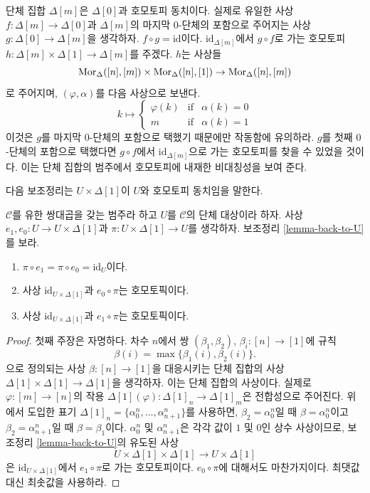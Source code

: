 \begin{example}
\label{example-simplex-contractible}
단체 집합 $\Delta[m]$은 $\Delta[0]$과 호모토피 동치이다. 실제로 유일한
사상 $f : \Delta[m] \to \Delta[0]$과 $\Delta[m]$의 마지막 $0$-단체의
포함으로 주어지는 사상 $g : \Delta[0] \to \Delta[m]$을 생각하자.
$f \circ g = \text{id}$이다. $\text{id}_{\Delta[m]}$에서 $g \circ f$로
가는 호모토피 $h : \Delta[m] \times \Delta[1] \to \Delta[m]$를 주겠다.
$h$는 사상들
$$
\mathop{\mathrm{Mor}}\nolimits_\Delta([n], [m]) \times \mathop{\mathrm{Mor}}\nolimits_\Delta([n], [1]) \to \mathop{\mathrm{Mor}}\nolimits_\Delta([n], [m])
$$
로 주어지며, $(\varphi, \alpha)$를 다음 사상으로 보낸다.
$$
k \mapsto
\left\{
\begin{matrix}
\varphi(k) & \text{if} & \alpha(k) = 0 \\
m & \text{if} & \alpha(k) = 1
\end{matrix}
\right.
$$
이것은 $g$를 마지막 $0$-단체의 포함으로 택했기 때문에만 작동함에
유의하라. $g$를 첫째 $0$-단체의 포함으로 택했다면 $g \circ f$에서
$\text{id}_{\Delta[m]}$으로 가는 호모토피를 찾을 수 있었을 것이다.
이는 단체 집합의 범주에서 호모토피에 내재한 비대칭성을 보여 준다.
\end{example}

\noindent
다음 보조정리는 $U \times \Delta[1]$이 $U$와 호모토피 동치임을 말한다.

\begin{lemma}
\label{lemma-contractible}
$\mathcal{C}$를 유한 쌍대곱을 갖는 범주라 하고 $U$를 $\mathcal{C}$의
단체 대상이라 하자. 사상 $e_1, e_0 : U \to U \times \Delta[1]$과
$\pi : U \times \Delta[1] \to U$를 생각하자. 보조정리
\ref{lemma-back-to-U}를 보라.
\begin{enumerate}
\item $\pi \circ e_1 = \pi \circ e_0 = \text{id}_U$이다.
\item 사상 $\text{id}_{U \times \Delta[1]}$과 $e_0 \circ \pi$는
호모토픽이다.
\item 사상 $\text{id}_{U \times \Delta[1]}$과 $e_1 \circ \pi$는
호모토픽이다.
\end{enumerate}
\end{lemma}

\begin{proof}
첫째 주장은 자명하다. 차수 $n$에서 쌍 $(\beta_1, \beta_2)$,
$\beta_i : [n] \to [1]$에 규칙
$$
\beta(i) = \max\{\beta_1(i), \beta_2(i)\}.
$$
으로 정의되는 사상 $\beta : [n] \to [1]$을 대응시키는 단체 집합의 사상
$\Delta[1] \times \Delta[1] \longrightarrow \Delta[1]$을 생각하자.
이는 단체 집합의 사상이다. 실제로 $\varphi : [m] \to [n]$의 작용
$\Delta[1](\varphi) : \Delta[1]_n \to \Delta[1]_m$은 전합성으로 주어진다.
위에서 도입한 표기
$\Delta[1]_n = \{\alpha^n_0, \ldots, \alpha^n_{n + 1}\}$를 사용하면,
$\beta_2 = \alpha^n_0$일 때 $\beta = \alpha^n_0$이고
$\beta_2 = \alpha^n_{n + 1}$일 때 $\beta = \beta_1$이다.
$\alpha^n_0$ 및 $\alpha^n_{n + 1}$은 각각 값이 $1$ 및 $0$인 상수
사상이므로, 보조정리 \ref{lemma-back-to-U}의 유도된 사상
$$
U \times \Delta[1] \times \Delta[1]
\longrightarrow
U \times \Delta[1]
$$
은 $\text{id}_{U \times \Delta[1]}$에서 $e_1 \circ \pi$로 가는
호모토피이다. $e_0 \circ \pi$에 대해서도 마찬가지이다. 최댓값 대신
최솟값을 사용하라.
\end{proof}

